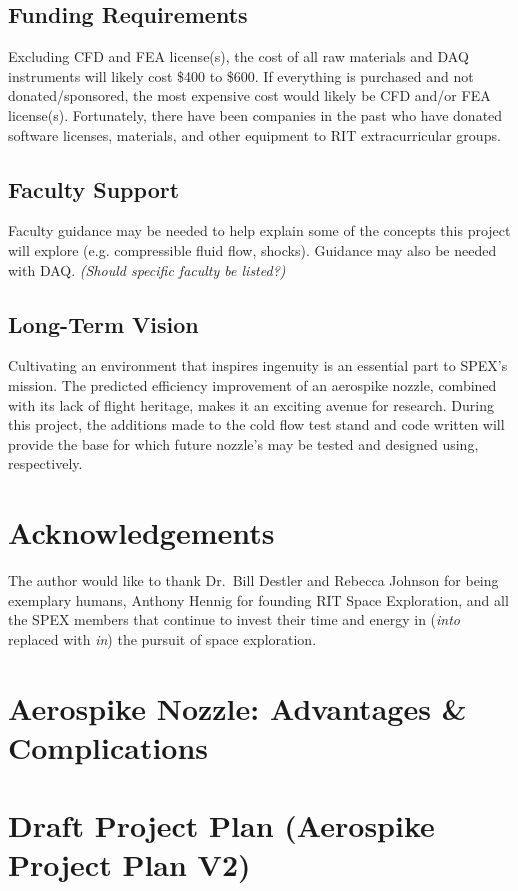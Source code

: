 \documentclass[conference]{IEEEtran} %
\begin{document}
	\subsection{Funding Requirements}
	Excluding CFD and FEA license(s), the cost of all raw materials and DAQ instruments will likely cost \$400 to \$600. If everything is purchased and not donated/sponsored, the most expensive cost would likely be CFD and/or FEA license(s). Fortunately, there have been companies in the past who have donated software licenses, materials, and other equipment to RIT extracurricular groups.
	
	\subsection{Faculty Support}
	Faculty guidance may be needed to help explain some of the concepts this project will explore (e.g. compressible fluid flow, shocks). Guidance may also be needed with DAQ. \textit{(Should specific faculty be listed?)}
	
	\subsection{Long-Term Vision}
	\label{sec:vision}
	Cultivating an environment that inspires ingenuity is an essential part to SPEX's mission. The predicted efficiency improvement of an aerospike nozzle, combined with its lack of flight heritage, makes it an exciting avenue for research. During this project, the additions made to the cold flow test stand and code written will provide the base for which future nozzle's may be tested and designed using, respectively.
	
	\section*{Acknowledgements}
	The author would like to thank Dr.~Bill Destler and Rebecca Johnson for being exemplary humans, Anthony Hennig for founding RIT Space Exploration, and all the SPEX members that continue to invest their time and energy in (\textit{into} replaced with \textit{in}) the pursuit of space exploration.
	
	
	
	
	\onecolumn
	
	\appendices{}
	
	\section{Aerospike Nozzle: Advantages \& Complications}
	
	
	\section{Draft Project Plan (Aerospike Project Plan V2)}
	
	
\end{document}
